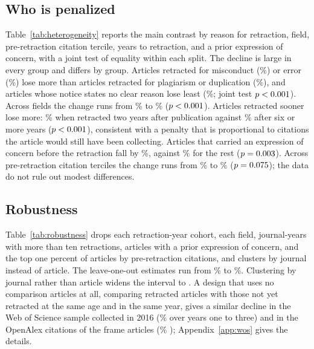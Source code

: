 \documentclass[11pt,letterpaper]{article}
\begin{document}
\subsection{Who is penalized}
Table~\ref{tab:heterogeneity} reports the main contrast by reason for retraction, field, pre-retraction citation tercile, years to retraction, and a prior expression of concern, with a joint test of equality within each split. The decline is large in every group and differs by group. Articles retracted for misconduct (\HetMisconduct\%) or error (\HetError\%) lose more than articles retracted for plagiarism or duplication (\HetDuplication\%), and articles whose notice states no clear reason lose least (\HetOther\%; joint test $p < 0.001$). Across fields the change runs from \HetFieldMin\% to \HetFieldMax\% ($p < 0.001$). Articles retracted sooner lose more: \HetLagTwo\% when retracted two years after publication against \HetLagSixPlus\% after six or more years ($p < 0.001$), consistent with a penalty that is proportional to citations the article would still have been collecting. Articles that carried an expression of concern before the retraction \citep{vaught2017concern, grey2022procrastination} fall by \HetPriorYes\%, against \HetPriorNo\% for the rest ($p = 0.003$). Across pre-retraction citation terciles the change runs from \HetTercileMin\% to \HetTercileMax\% ($p = 0.075$); the data do not rule out modest differences.

\begin{table}[tb]
\centering
\caption{Change in citations relative to matched comparison articles, years one to three after retraction, by group. Each block is one Poisson model with group-specific post-retraction coefficients; the $p$-value is a joint Wald test of equal coefficients within the block. Intervals are 95\%, clustered by article.}
\label{tab:heterogeneity}
\end{table}

\subsection{Robustness}
Table~\ref{tab:robustness} drops each retraction-year cohort, each field, journal-years with more than ten retractions, articles with a prior expression of concern, and the top one percent of articles by pre-retraction citations, and clusters by journal instead of article. The leave-one-out estimates run from \LooMin\% to \LooMax\%. Clustering by journal rather than article widens the interval to \JournalClusteredInterval. A design that uses no comparison articles at all, comparing retracted articles with those not yet retracted at the same age and in the same year, gives a similar decline in the Web of Science sample collected in 2016 (\TimingWosAverage\% \TimingWosInterval{} over years one to three) and in the OpenAlex citations of the frame articles (\TimingOpenAlexAverage\% \TimingOpenAlexInterval); Appendix~\ref{app:wos} gives the details.
\end{document}
